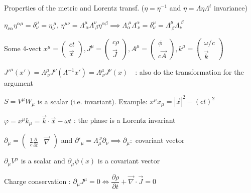 \item Properties of the metric and Lorentz transf. ($\eta=\eta^{-1}$ and $\eta=\Lambda\eta\Lambda^t$ invariance)

$ \eta_{\nu\alpha}\eta^{\alpha\mu} = \delta_\nu^\mu = \eta_\nu^{\ \mu}$, \quad $\eta^{\mu\nu} = \Lambda^{\mu}_{\ \alpha}\Lambda^{\nu}_{\ \beta}\eta^{\alpha\beta} \implies \Lambda_\alpha^{\ \mu}\Lambda^\alpha_{\ \nu} = \delta^\mu_\nu = \Lambda^\mu_{\ \beta}\Lambda_{\nu}^{\ \beta} $


\item Some 4-vect $ x^{\mu} =
	\begin{pmatrix}
	ct\\
	\vec{x}
	\end{pmatrix}, J^{\mu} = \begin{pmatrix}
	c\rho\\
	\vec{J}
	\end{pmatrix}, A^{\mu} =
	\begin{pmatrix}
	\phi\\
	c\vec{A}
	\end{pmatrix}, k^\mu=
    \begin{pmatrix}
     \omega/c \\
     \Vec{k}
    \end{pmatrix}$
\item $J'^{\mu} (x') = \Lambda^{\mu}_{\ \nu} J^{\nu}(\Lambda^{-1}x') = \Lambda^{\mu}_{\ \nu} J^{\nu} (x) $ \,\, : also do the transformation for the argument


\item $S = V^{\mu}W_{\mu}$ is a scalar (i.e. invariant). Example: $x^{\mu}x_{\mu} =  |\vec{x}|^2 -(ct)^2$

\item $\varphi = x^\mu k_\mu =  \vec{k}\cdot\vec{x}-\omega t $ : the phase is a Lorentz invariant 


\item $\partial_{\mu} = 
\begin{pmatrix}
\frac{1}{c} \frac{\partial}{\partial t} &
\vec{\nabla}
\end{pmatrix}$ and $\partial'_{\mu} = \Lambda^{\ \nu}_{\mu} \partial_{\nu} \implies \partial_{\mu} :$ covariant vector

\item $\partial_{\mu} V^{\mu}$ is a scalar and $\partial_{\mu} \psi(x) $ is a covariant vector
\squishend
{}
\squishlist
\item Charge conservation : $\partial_{\mu}J^{\mu} = 0 \Leftrightarrow \dfrac{\partial \rho}{\partial t} + \vec{\nabla} \cdot \vec{J} = 0 $

